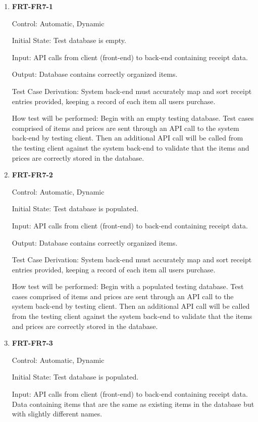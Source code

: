 \documentclass[12pt, titlepage]{article}
\begin{document}
\begin{enumerate}

\item{\textbf{FRT-FR7-1}}

Control: Automatic, Dynamic
          
Initial State: Test database is empty.

Input: API calls from client (front-end) to back-end containing receipt data.
          
Output: Database contains correctly organized items.

Test Case Derivation: System back-end must accurately map and sort receipt entries provided, keeping a record of each item all users purchase.
          
How test will be performed: Begin with an empty testing database. Test cases comprised of items and prices are sent through an API call to the system back-end by testing client. Then an additional API call will be called from the testing client against the system back-end to validate that the items and prices are correctly stored in the database.

\item{\textbf{FRT-FR7-2}}

Control: Automatic, Dynamic
          
Initial State: Test database is populated.

Input: API calls from client (front-end) to back-end containing receipt data.
          
Output: Database contains correctly organized items.

Test Case Derivation: System back-end must accurately map and sort receipt entries provided, keeping a record of each item all users purchase.
          
How test will be performed: Begin with a populated testing database. Test cases comprised of items and prices are sent through an API call to the system back-end by testing client. Then an additional API call will be called from the testing client against the system back-end to validate that the items and prices are correctly stored in the database.

\item{\textbf{FRT-FR7-3}}

Control: Automatic, Dynamic
          
Initial State: Test database is populated.

Input: API calls from client (front-end) to back-end containing receipt data. Data containing items that are the same as existing items in the database but with slightly different names.
          

\end{enumerate}
\end{document}
